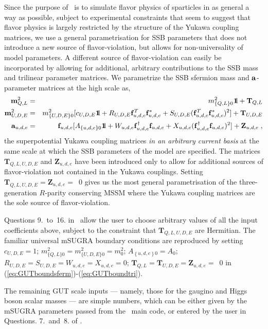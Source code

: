Since the purpose of \progrge~is to simulate flavor physics of
sparticles in as general a way as possible, subject to experimental
constraints that seem to suggest that flavor physics is largely
restricted by the structure of the Yukawa coupling matrices, we use a
general parametrisation for SSB parameters that does not introduce a new
source of flavor-violation, but allows for non-universality of model
parameters. A different source of flavor-violation can easily be
incorporated by allowing for additional, arbitrary contributions to the
SSB mass and trilinear parameter matrices. We parametrize the SSB
sfermion mass and ${{\mathbf{a}}}$-parameter matrices at the high scale as, %
\begin{eqnarray}
\bdm^2_{Q,L}&=&m^2_{\{Q,L\}0}\dblone+{\mathbf{T}}_{Q,L}\\
\bdm^2_{U,D,E}&=&m^2_{\{U,D,E\}0}[c_{U,D,E}\dblone+R_{U,D,E}\bdf^T_{u,d,e}
\bdf^*_{u,d,e}+S_{U,D,E}(\bdf^T_{u,d,e}\bdf^*_{u,d,e})^2]+{\mathbf{T}}_{U,D,E}\label{eq:GUTboundsferm}\\
\ba_{u,d,e}&=&\bdf_{u,d,e}[A_{\{u,d,e\}0}\dblone+W_{u,d,e}\bdf^\dagger_{u,d,e}\bdf_{u,d,e}+X_{u,d,e}(\bdf^\dagger_{u,d,e}\bdf_{u,d,e})^2]+{\mathbf{Z}}_{u,d,e}\;,
\label{eq:GUTboundtri}
\end{eqnarray} %
the superpotential Yukawa coupling matrices {\it in an arbitrary current
basis} at the same scale at which the SSB parameters of the model are
specified. The matrices ${\mathbf{T}}_{Q,L,U,D,E}$ and
${\mathbf{Z}}_{u,d,e}$ have been introduced only to allow for additional
sources of flavor-violation not contained in the Yukawa couplings.
Setting ${\mathbf{T}}_{Q,L,U,D,E}={\mathbf{Z}}_{u,d,e}=$~{\boldmath$0$}
gives us the most general parametrisation of the three-generation
$R$-parity conserving MSSM where the Yukawa coupling matrices are the
sole source of flavor-violation.

Questions 9.~to~16. in \inrge~allow the user to choose arbitrary values
of all the input coefficients above, subject to the constraint that
${\mathbf{T}}_{Q,L,U,D,E}$ are Hermitian. The familiar universal mSUGRA
boundary conditions are reproduced by setting $c_{U,D,E}=1$;
$m^{2}_{\{Q,L\}0}=m^{2}_{\{U,D,E\}0}=m^{2}_{0}$;
$A_{\left\{u,d,e\right\}0}=A_{0}$;
$R_{U,D,E}=S_{U,D,E}=W_{u,d,e}=X_{u,d,e}=0$;
${\mathbf{T}}_{Q,L}={\mathbf{T}}_{U,D,E}={\mathbf{Z}}_{u,d,e}=$~{\boldmath$0$}
in (\ref{eq:GUTboundsferm})-(\ref{eq:GUTboundtri}).

The remaining GUT scale inputs \mbox{---} namely, those for the gaugino
and Higgs boson scalar masses \mbox{---} are simple numbers, which can
be either given by the mSUGRA parameters passed from the
\progisasug~main code, or entered by the user in Questions. 7.~and~8. of
\inrge.

